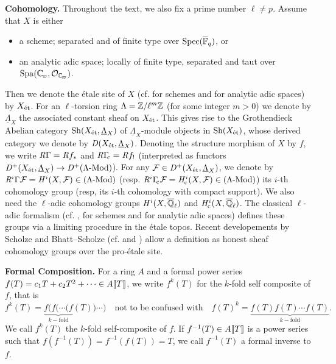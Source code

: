 \documentclass[../main.tex]{subfiles}
\begin{document}
\textbf{Cohomology.} 
Throughout the text, we also fix a prime number $\ell \neq p$.
Assume that $X$ is either 
\begin{itemize}
  \item a scheme; separated and of finite type over $\operatorname{Spec}({\overline {\mathbb{F}}_q})$, or
  \item an analytic adic space; locally of finite type, separated and taut over
    $\spa(\Cp, \cO_\Cp)$. 
\end{itemize}
Then we denote the \'etale site of $X$ (cf. \cite{LeiFuEtale} for schemes and
\cite{huber2013etale} for analytic adic spaces) by $X_{\textnormal{\'et}}$. For an
$\ell$-torsion ring $\Lambda = \mathbb{Z}/\ell^m \mathbb{Z}$ (for some integer $m>0$) we denote
by $\underline \Lambda_X$ the associated constant sheaf on $X_{\textnormal{\'et}}$. This gives
rise to the Grothendieck Abelian category $\mathrm{Sh}(X_{\textnormal{\'et}}, {\underline \Lambda_X})$ of
$\underline \Lambda_X$-module objects in $\mathrm{Sh}(X_{\textnormal{\'et}})$, whose derived category
we denote by $\mathit D(X_{\textnormal{\'et}}, \underline \Lambda_X)$. 
Denoting the structure morphism of $X$ by $f$, we write 
$\mathit R \Gamma = \mathit R f_*$ and $\mathit R \Gamma_{\hspace{-2pt}\mathrm{c}} = \mathit R f_!$ (interpreted as functors
$\mathit D^+(X_{\textnormal{\'et}}, \underline \Lambda_X) \to \mathit D^+{({\Lambda}\textnormal-\allowbreak\mathrm{Mod})}$).
For any $\mathcal{F} \in \mathit D^+(X_{\textnormal{\'et}}, \underline \Lambda_X)$, we denote 
by $\mathit R^i\Gamma\mathcal{F} = \mathit H^i(X, \mathcal{F}) \in {({\Lambda}\textnormal-\allowbreak\mathrm{Mod})}$ (resp. $\mathit R^i \Gamma_{\hspace{-2pt}\mathrm{c}} \mathcal{F} = 
\mathit H_{\mathrm{c}}^i(X, \mathcal{F}) \in {({\Lambda}\textnormal-\allowbreak\mathrm{Mod})}$) its $i$-th cohomology group (resp, its
$i$-th cohomology with compact support).
We also need the $\ell$-adic cohomology groups $\mathit H^i(X, {\overline {\mathbb{Q}}_\ell})$ 
and $\mathit H_{\mathrm{c}}^i(X, {\overline {\mathbb{Q}}_\ell})$. The classical $\ell$-adic formalism (cf. \cite{LeiFuEtale},
\cite{jannsen1988continuous} for schemes and \cite{huber1998comparison} for
analytic adic spaces) defines these groups via a limiting procedure in the 
\'etale topos. Recent developements by Scholze and Bhatt--Scholze (cf.
\cite{scholze2017etale} and \cite{bhattscholze2013pro}) allow a definition
as honest sheaf cohomology groups over the pro-\'etale site.

\textbf{Formal Composition.}
For a ring $A$ and a formal power series $f(T) = c_1 T + c_2 T^2 + \dots \in
A\llbracket T \rrbracket$, we write $f^k(T)$ for the $k$-fold self composite of $f$, that is
\begin{equation*}
  f^k(T) = \underbrace{f(f( \cdots (f}_{k-\text{fold}}(T)) \cdots) \quad \text{not to be confused with}
  \quad f(T)^k = \underbrace{f(T) f(T) \cdots f(T)}_{k-\text{fold}}.
\end{equation*}
We call $f^k(T)$ the $k$-fold self-composite of $f$. If $f^{-1}(T) \in A\llbracket T \rrbracket$
is a power series such that $f(f^{-1}(T)) = f^{-1}(f(T)) = T$, we call
$f^{-1}(T)$ a formal inverse to $f$.
\end{document}

